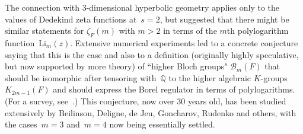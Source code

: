 \documentclass[12pt,reqno]{amsart}
\theoremstyle{definition}
\def\B{\mathcal B}  \def\hB{\widehat\B}
\def\z{\zeta}
\def\Li{\mathrm{Li}}
\def\Q{\mathbb Q}
\begin{document}
The connection with 3-dimensional hyperbolic geometry applies only to the values of
Dedekind zeta functions at~$s=2$, but suggested that there might be similar statements for
$\z_F(m)$ with $m>2$ in terms of the $m$th polylogarithm function~$\Li_m(z)$.  Extensive
numerical experiments led to a concrete conjecture saying that this is the case and also to
a definition (originally highly speculative, but now supported by more theory) of ``higher
Bloch groups" $\B_m(F)$ that should be isomorphic after tensoring with~$\Q$ to the higher
algebraic \hbox{$K$-groups} $K_{2m-1}(F)$ and should express the Borel regulator in terms of
polylogarithms. (For a survey, see~\cite{Z:polylogs}.)  This conjecture, now over 30 years
old, has been studied extensively by Beilinson, Deligne, de Jeu, Goncharov, Rudenko and 
others, with the cases~$m=3$ and~$m=4$ now being essentially settled.

\bigskip 

\end{document}
